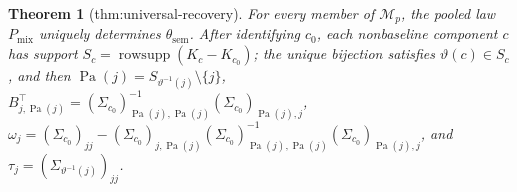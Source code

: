 \documentclass{article}
\newtheorem{theorem}{Theorem}
\begin{document}
\begin{theorem}[thm:universal-recovery]\label{thm:universal-recovery}
For every member of \(\mathcal M_p\), the pooled law \(P_{\mathrm{mix}}\) uniquely determines \(\theta_{\mathrm{sem}}\). After identifying \(c_0\), each nonbaseline component \(c\) has support \(S_c=\operatorname{rowsupp}(K_c-K_{c_0})\); the unique bijection satisfies \(\vartheta(c)\in S_c\), and then \(\operatorname{Pa}(j)=S_{\vartheta^{-1}(j)}\setminus\{j\}\), \(B_{j,\operatorname{Pa}(j)}^{\top}=(\Sigma_{c_0})_{\operatorname{Pa}(j),\operatorname{Pa}(j)}^{-1}(\Sigma_{c_0})_{\operatorname{Pa}(j),j}\), \(\omega_j=(\Sigma_{c_0})_{jj}-(\Sigma_{c_0})_{j,\operatorname{Pa}(j)}(\Sigma_{c_0})_{\operatorname{Pa}(j),\operatorname{Pa}(j)}^{-1}(\Sigma_{c_0})_{\operatorname{Pa}(j),j}\), and \(\tau_j=(\Sigma_{\vartheta^{-1}(j)})_{jj}\).
\end{theorem}
\end{document}

